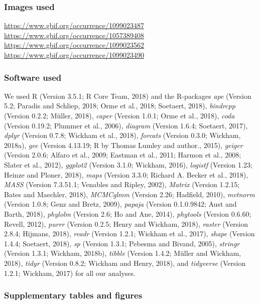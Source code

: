 \documentclass[man,floatsintext]{apa6}
\theoremstyle{definition}
\theoremstyle{definition}
\theoremstyle{definition}
\theoremstyle{remark}
\begin{document}
\hypertarget{images-used}{%
\subsubsection{Images used}\label{images-used}}

\url{https://www.gbif.org/occurrence/1099023487}
\url{https://www.gbif.org/occurrence/1057389408}
\url{https://www.gbif.org/occurrence/1099023562}
\url{https://www.gbif.org/occurrence/1099023490}

\hypertarget{software-used}{%
\subsubsection{Software used}\label{software-used}}

We used R (Version 3.5.1; R Core Team, 2018) and the R-packages
\emph{ape} (Version 5.2; Paradis and Schliep, 2018; Orme et al., 2018;
Soetaert, 2018), \emph{bindrcpp} (Version 0.2.2; Müller, 2018),
\emph{caper} (Version 1.0.1; Orme et al., 2018), \emph{coda} (Version
0.19.2; Plummer et al., 2006), \emph{diagram} (Version 1.6.4; Soetaert,
2017), \emph{dplyr} (Version 0.7.8; Wickham et al., 2018),
\emph{forcats} (Version 0.3.0; Wickham, 2018a), \emph{gee} (Version
4.13.19; R by Thomas Lumley and author., 2015), \emph{geiger} (Version
2.0.6; Alfaro et al., 2009; Eastman et al., 2011; Harmon et al., 2008;
Slater et al., 2012), \emph{ggplot2} (Version 3.1.0; Wickham, 2016),
\emph{logistf} (Version 1.23; Heinze and Ploner, 2018), \emph{maps}
(Version 3.3.0; Richard A. Becker et al., 2018), \emph{MASS} (Version
7.3.51.1; Venables and Ripley, 2002), \emph{Matrix} (Version 1.2.15;
Bates and Maechler, 2018), \emph{MCMCglmm} (Version 2.26; Hadfield,
2010), \emph{mvtnorm} (Version 1.0.8; Genz and Bretz, 2009),
\emph{papaja} (Version 0.1.0.9842; Aust and Barth, 2018), \emph{phylolm}
(Version 2.6; Ho and Ane, 2014), \emph{phytools} (Version 0.6.60;
Revell, 2012), \emph{purrr} (Version 0.2.5; Henry and Wickham, 2018),
\emph{raster} (Version 2.8.4; Hijmans, 2018), \emph{readr} (Version
1.2.1; Wickham et al., 2017), \emph{shape} (Version 1.4.4; Soetaert,
2018), \emph{sp} (Version 1.3.1; Pebesma and Bivand, 2005),
\emph{stringr} (Version 1.3.1; Wickham, 2018b), \emph{tibble} (Version
1.4.2; Müller and Wickham, 2018), \emph{tidyr} (Version 0.8.2; Wickham
and Henry, 2018), and \emph{tidyverse} (Version 1.2.1; Wickham, 2017)
for all our analyses.

\hypertarget{supplementary-tables-and-figures}{%
\subsubsection{Supplementary tables and
figures}\label{supplementary-tables-and-figures}}
\end{document}
